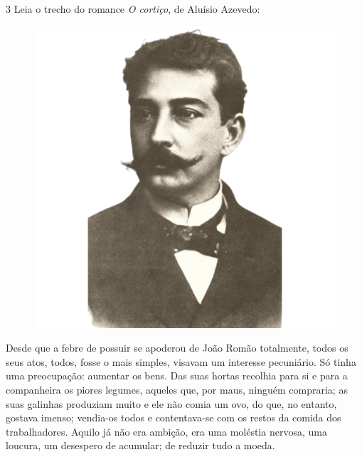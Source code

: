 \num{3} Leia o trecho do romance \textit{O cortiço}, de Aluísio Azevedo:



\begin{myquote}

\begin{figure}[H]
\centering
\includegraphics[scale=0.25]{./imgSAEB_7_POR/media/image53.png}
\end{figure}

Desde que a febre de possuir se apoderou de João Romão totalmente, todos os seus atos, todos, 
fosse o mais simples, visavam um interesse pecuniário. Só tinha uma preocupação: aumentar 
os bens. Das suas hortas recolhia para si e para a companheira os piores legumes, aqueles que,
por maus, ninguém compraria; as suas galinhas produziam muito e ele não comia um ovo, do que, 
no entanto, gostava imenso; vendia-os todos e contentava-se com os restos da comida dos 
trabalhadores. Aquilo já não era ambição, era uma moléstia nervosa, uma loucura, um desespero
de acumular; de reduzir tudo a moeda.


\end{myquote}


